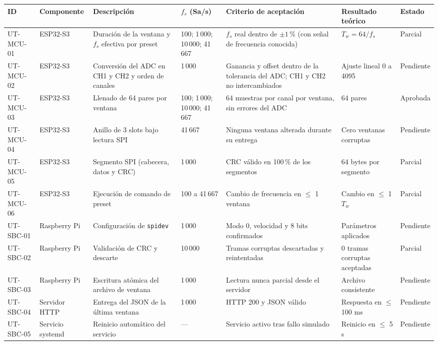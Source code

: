 \documentclass[12pt,a4paper]{article}
\begin{document}
\begin{table}[H]
\centering
\scriptsize
\begin{tabular}{@{}p{1.3cm} p{1.7cm} p{3.3cm} p{1.7cm} p{3.0cm} p{2.5cm} p{1.4cm}@{}}
\toprule
\textbf{ID} & \textbf{Componente} & \textbf{Descripción} & \textbf{$f_s$ (Sa/s)} & \textbf{Criterio de aceptación} & \textbf{Resultado teórico} & \textbf{Estado} \\
\midrule
UT-MCU-01 & ESP32-S3 & Duración de la ventana y $f_s$ efectiva por preset & 100; 1\,000; 10\,000; 41\,667 & $f_s$ real dentro de $\pm 1\,\%$ (con señal de frecuencia conocida) & $T_w = 64/f_s$ & Parcial \\
UT-MCU-02 & ESP32-S3 & Conversión del ADC en CH1 y CH2 y orden de canales & 1\,000 & Ganancia y offset dentro de la tolerancia del ADC; CH1 y CH2 no intercambiados & Ajuste lineal 0 a 4095 & Pendiente \\
UT-MCU-03 & ESP32-S3 & Llenado de 64 pares por ventana & 100; 1\,000; 10\,000; 41\,667 & 64 muestras por canal por ventana, sin errores del ADC & 64 pares & Aprobada \\
UT-MCU-04 & ESP32-S3 & Anillo de 3 slots bajo lectura SPI & 41\,667 & Ninguna ventana alterada durante su entrega & Cero ventanas corruptas & Pendiente \\
UT-MCU-05 & ESP32-S3 & Segmento SPI (cabecera, datos y CRC) & 1\,000 & CRC válido en 100\,\% de los segmentos & 64 bytes por segmento & Parcial \\
UT-MCU-06 & ESP32-S3 & Ejecución de comando de preset & 100 a 41\,667 & Cambio de frecuencia en $\leq$ 1 ventana & Cambio en $\leq$ 1 $T_w$ & Parcial \\
UT-SBC-01 & Raspberry Pi & Configuración de \texttt{spidev} & 1\,000 & Modo 0, velocidad y 8 bits confirmados & Parámetros aplicados & Pendiente \\
UT-SBC-02 & Raspberry Pi & Validación de CRC y descarte & 10\,000 & Tramas corruptas descartadas y reintentadas & 0 tramas corruptas aceptadas & Parcial \\
UT-SBC-03 & Raspberry Pi & Escritura atómica del archivo de ventana & 1\,000 & Lectura nunca parcial desde el servidor & Archivo consistente & Pendiente \\
UT-SBC-04 & Servidor HTTP & Entrega del JSON de la última ventana & 1\,000 & HTTP 200 y JSON válido & Respuesta en $\leq$ 100 ms & Pendiente \\
UT-SBC-05 & Servicio systemd & Reinicio automático del servicio & --- & Servicio activo tras fallo simulado & Reinicio en $\leq$ 5 s & Pendiente \\

\end{tabular}
\end{table}
\end{document}
